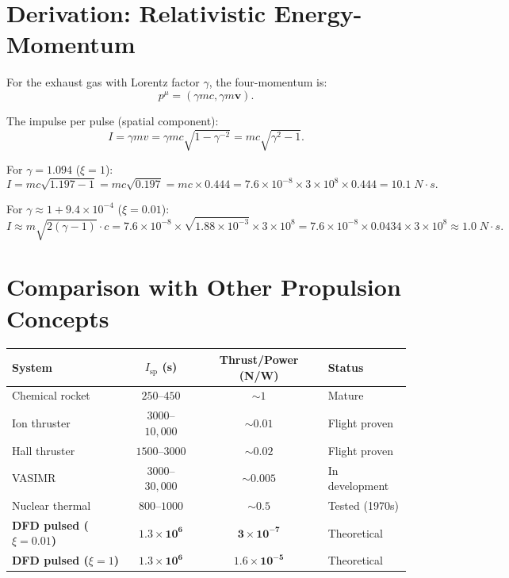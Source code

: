 \documentclass[amsmath,amssymb,aps,prd,superscriptaddress,nofootinbib]{revtex4-2}
\begin{document}
\section{Derivation: Relativistic Energy-Momentum}\label{app:relativistic}

For the exhaust gas with Lorentz factor $\gamma$, the four-momentum is:
\begin{equation}
p^\mu = (\gamma m c, \gamma m \mathbf{v}).
\end{equation}

The impulse per pulse (spatial component):
\begin{equation}
I = \gamma m v = \gamma m c \sqrt{1 - \gamma^{-2}}
= mc\sqrt{\gamma^2 - 1}.
\end{equation}

For $\gamma = 1.094$ ($\xi = 1$):
\begin{equation}
I = mc\sqrt{1.197 - 1} = mc\sqrt{0.197}
= mc \times 0.444
= 7.6 \times 10^{-8} \times 3 \times 10^8 \times 0.444
= 10.1 \; \si{N \cdot s}.
\end{equation}

For $\gamma \approx 1 + 9.4 \times 10^{-4}$ ($\xi = 0.01$):
\begin{equation}
I \approx m \sqrt{2(\gamma - 1)} \cdot c
= 7.6 \times 10^{-8} \times \sqrt{1.88 \times 10^{-3}} \times 3 \times 10^8
= 7.6 \times 10^{-8} \times 0.0434 \times 3 \times 10^8
\approx 1.0 \; \si{N \cdot s}.
\end{equation}

\section{Comparison with Other Propulsion Concepts}\label{app:comparison}

\begin{center}
\begin{tabular}{lccl}
\toprule
System & $I_\text{sp}$ (s) & Thrust/Power (N/W) & Status \\
\midrule
Chemical rocket & $250$--$450$ & $\sim 1$ & Mature \\
Ion thruster & $3000$--$10{,}000$ & $\sim 0.01$ & Flight proven \\
Hall thruster & $1500$--$3000$ & $\sim 0.02$ & Flight proven \\
VASIMR & $3000$--$30{,}000$ & $\sim 0.005$ & In development \\
Nuclear thermal & $800$--$1000$ & $\sim 0.5$ & Tested (1970s) \\
\textbf{DFD pulsed ($\xi=0.01$)} & $\mathbf{1.3 \times 10^6}$ & $\mathbf{3 \times 10^{-7}}$ & Theoretical \\
\textbf{DFD pulsed ($\xi=1$)} & $\mathbf{1.3 \times 10^6}$ & $\mathbf{1.6 \times 10^{-5}}$ & Theoretical \\
\bottomrule
\end{tabular}
\end{center}
\end{document}
